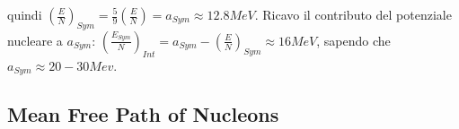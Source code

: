quindi $(\frac{E}{N})_{Sym}=\frac{5}{9}(\frac{E}{N})=a_{Sym}\approx 12.8 MeV$. Ricavo il contributo del potenziale nucleare a $a_{Sym}$:
$(\frac{E_{Sym}}{N})_{Int}=a_{Sym}-(\frac{E}{N})_{Sym}\approx16 MeV$, sapendo che $a_{Sym}\approx20-30 Mev$.

\subsection{Mean Free Path of Nucleons}

\begin{comment}
Mean Free Path of Nucleons
A fundamental characteristic of any many-body system is the mean free path for collisions between constituent particles. A wide variety of evidence testifies to the fact that, in the nucleus, this mean free path is large compared to the distance between the nucleons and even, under many circumstances, is larger than the dimensions of the nucleus.
A very direct way to explore the nuclear opacity is provided by scattering experiments involving incident neutrons and protons. 
 For a system with a mean free path small com- pared to the radius, the total cross section would vary monotonically with energy, decreasing slowly over the eneirgy region considered, toward the limiting value 2nR ’. (For a discussion of general scattering theory as applied to nuclei, and for the estimate of cross sections for totally absorbing systems, see, for example, Blatt and Weisskopf, 1952, Chapter 8.) The pronounced variations in the observed cross sections must be attributed to the interference between the incident and transmitted waves, and thus establish the fact that the mean free path is at least comparable with the nuclear radius. (We later return to the more quantitative analysis of such scattering experiments (Sec. 2-4c); see also the discussion in connection with Fig. 2-3.)
The relatively long mean free path of the nucleons implies that the inter- actions primarily contribute a smoothly varying average potential in which the particles move independently. As a first approximation of heavy nuclei, we may neglect surface effects, and the resulting Fermi gas model provides a useful starting point for the discussion of many of the bulk properties of nuclei.
\end{comment}